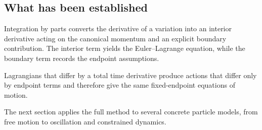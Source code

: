 \subsection{What has been established}

Integration by parts converts the derivative of a variation into an interior derivative acting on the canonical momentum and an explicit boundary contribution. The interior term yields the Euler--Lagrange equation, while the boundary term records the endpoint assumptions.

Lagrangians that differ by a total time derivative produce actions that differ only by endpoint terms and therefore give the same fixed-endpoint equations of motion.

The next section applies the full method to several concrete particle models, from free motion to oscillation and constrained dynamics.